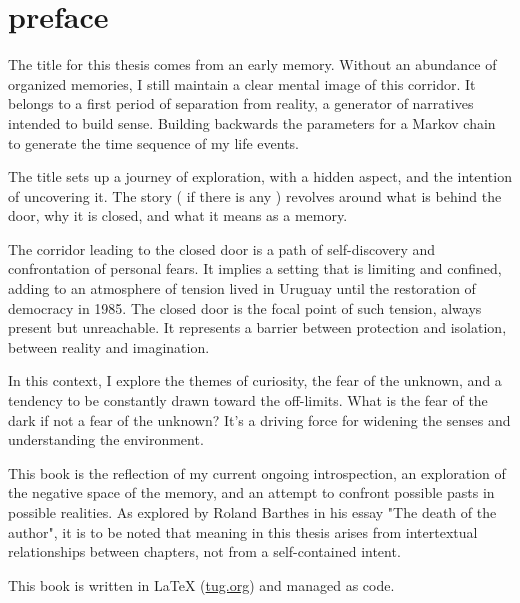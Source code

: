 \chapter*{preface}
\normalsize

The title for this thesis comes from an early memory. Without an abundance of organized memories, I still maintain a clear mental image of this corridor. It belongs to a first period of separation from reality, a generator of narratives intended to build sense. Building backwards the parameters for a Markov chain to generate the time sequence of my life events.    

The title sets up a journey of exploration, with a hidden aspect, and the intention of uncovering it. The story ( if there is any ) {r}evolves around what is behind the door, why it is closed, and what it means as a memory.

The corridor leading to the closed door is a path of self-discovery and confrontation of personal fears. It implies a setting that is limiting and confined, adding to an atmosphere of tension lived in Uruguay until the restoration of democracy in 1985. The closed door is the focal point of such tension, always present but unreachable. It represents a barrier between protection and isolation, between reality and imagination.

In this context, I explore the themes of curiosity, the fear of the unknown, and a tendency to be constantly drawn toward the off-limits. What is the fear of the dark if not a fear of the unknown? It’s a driving force for widening the senses and understanding the environment.

This book is the reflection of my current ongoing introspection, an exploration of the negative space of the memory, and an attempt to confront possible pasts in possible realities. As explored by Roland Barthes in his essay "The death of the author"\citep{barthes1967}, it is to be noted that meaning in this thesis arises from intertextual relationships between chapters, not from a self-contained intent.

This book is written in \LaTeX{} (\href{https://www.tug.org/texlive/quickinstall.html}{tug.org}) and managed as code.



